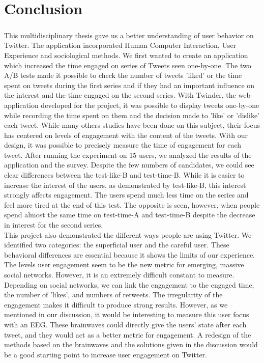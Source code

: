 \chapter*{Conclusion}

\paragraph{}
This multidisciplinary thesis gave us a better understanding of user behavior on Twitter. The application incorporated Human Computer Interaction, User Experience and sociological methods. We first wanted to create an application which increased the time engaged on series of Tweets seen one-by-one. The two A/B tests made it possible to check the number of tweets 'liked' or the time spent on tweets during the first series and if they had an important influence on the interest and the time engaged on the second series. With Twinder, the web application developed for the project, it was possible to display tweets one-by-one while recording the time spent on them and the decision made to 'like' or 'dislike' each tweet. While many others studies have been done on this subject, their focus has centered on levels of engagement with the content of the tweets. With our design, it was possible to precisely measure the time of engagement for each tweet.
After running the experiment on 15 users, we analyzed the results of the application and the survey. Despite the few numbers of candidates, we could see clear differences between the test-like-B and test-time-B. While it is easier to increase the interest of the users, as demonstrated by test-like-B, this interest strongly affects engagement. The users spend much less time on the series and feel more tired at the end of this test. The opposite is seen, however, when people spend almost the same time on test-time-A and test-time-B despite the decrease in interest for the second series. \\ 
This project also demonstrated the different ways people are using Twitter. We identified two categories: the superficial user and the careful user. These behavioral differences are essential because it shows the limits of our experience. \\
The levels user engagement seem to be the new metric for emerging, massive social networks. However, it is an extremely difficult constant to measure. Depending on social networks, we can link the engagement to the engaged time, the number of 'likes', and numbers of retweets. The irregularity of the engagement makes it difficult to produce strong results. However, as we mentioned in our discussion, it would be interesting to measure this user focus with an EEG. These brainwaves could directly give the users' state after each tweet, and they would act as a better metric for engagement. A redesign of the methods based on the brainwaves and the solutions given in the discussion would be a good starting point to increase user engagement on Twitter. 